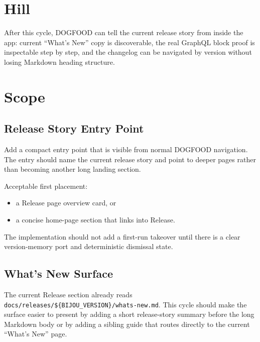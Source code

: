 \section{Hill}\label{record-118-hill}

After this cycle, DOGFOOD can tell the current release story from inside the app: current ``What's New'' copy is discoverable, the real GraphQL block proof is inspectable step by step, and the changelog can be navigated by version without losing Markdown heading structure.

\section{Scope}\label{record-118-scope}

\subsection{Release Story Entry Point}\label{record-118-release-story-entry-point}

Add a compact entry point that is visible from normal DOGFOOD navigation. The entry should name the current release story and point to deeper pages rather than becoming another long landing section.

Acceptable first placement:

\begin{itemize}
\tightlist
\item
  a Release page overview card, or
\item
  a concise home-page section that links into Release.
\end{itemize}

The implementation should not add a first-run takeover until there is a clear version-memory port and deterministic dismissal state.

\subsection{What's New Surface}\label{record-118-whats-new-surface}

The current Release section already reads \texttt{d\allowbreak{}o\allowbreak{}c\allowbreak{}s\allowbreak{}/\allowbreak{}r\allowbreak{}e\allowbreak{}l\allowbreak{}e\allowbreak{}a\allowbreak{}s\allowbreak{}e\allowbreak{}s\allowbreak{}/\allowbreak{}\$\allowbreak{}\{\allowbreak{}B\allowbreak{}I\allowbreak{}J\allowbreak{}O\allowbreak{}U\allowbreak{}\_\allowbreak{}V\allowbreak{}E\allowbreak{}R\allowbreak{}S\allowbreak{}I\allowbreak{}O\allowbreak{}N\allowbreak{}\}\allowbreak{}/\allowbreak{}w\allowbreak{}h\allowbreak{}a\allowbreak{}t\allowbreak{}s\allowbreak{}-\allowbreak{}n\allowbreak{}e\allowbreak{}w\allowbreak{}.\allowbreak{}m\allowbreak{}d}. This cycle should make the surface easier to present by adding a short release-story summary before the long Markdown body or by adding a sibling guide that routes directly to the current ``What's New'' page.

